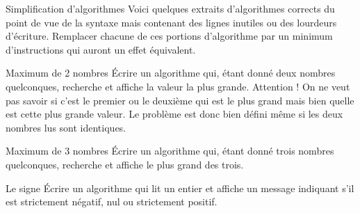 \begin{Exercice}{Simplification d'algorithmes}
Voici quelques extraits d’algorithmes corrects du point de vue de la
syntaxe mais contenant des lignes inutiles ou des lourdeurs d’écriture.
Remplacer chacune de ces portions d’algorithme par un minimum
d’instructions qui auront un effet équivalent.





\end{Exercice}

\begin{Exercice}{Maximum de 2 nombres}
Écrire un algorithme qui, étant donné deux nombres quelconques,
recherche et affiche la valeur la plus grande. Attention ! On ne veut
pas savoir si c'est le premier ou le deuxième qui est
le plus grand mais bien quelle est cette plus grande valeur. Le
problème est donc bien défini même si les deux nombres lus sont
identiques.
\end{Exercice}

\begin{Exercice}{Maximum de 3 nombres}
Écrire un algorithme qui, étant donné trois nombres quelconques,
recherche et affiche le plus grand des trois.
\end{Exercice}

\begin{Exercice}{Le signe}
Écrire un algorithme qui lit un entier et affiche un message indiquant
s'il est strictement négatif, nul ou strictement
positif.
\end{Exercice}


